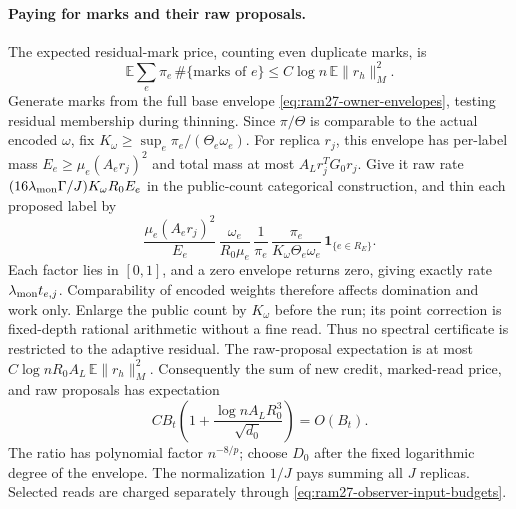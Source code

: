\documentclass[11pt]{article}
\theoremstyle{remark}
\newcommand{\Ex}{\mathbb E}
\newcommand{\norm}[1]{\lVert#1\rVert}
\begin{document}
\paragraph{Paying for marks and their raw proposals.}
The expected residual-mark price, counting even duplicate marks, is
\[
 \Ex\sum_e\pi_e\,\#\{\text{marks of }e\}
       \le C \log n\,\Ex\norm{r_h}_M^2 .
\]
Generate marks from the full base envelope \eqref{eq:ram27-owner-envelopes},
testing residual membership during thinning.
Since $\pi/\Theta$ is comparable to the actual encoded $\omega$, fix
$K_\omega\ge\sup_e\pi_e/(\Theta_e\omega_e)$.
For replica $r_j$, this envelope has per-label mass $E_e\ge\mu_e(A_er_j)^2$ and
total mass at most $A_L r_j^TG_0r_j$.
Give it raw rate $(16\lambda_{\rm mon}\Gamma/J)K_\omega R_0E_e$ in the
public-count categorical construction, and thin each proposed label by
\[
 \frac{\mu_e(A_er_j)^2}{E_e}\,
 \frac{\omega_e}{R_0\mu_e}\,
 \frac1{\pi_e}\,
 \frac{\pi_e}{K_\omega\Theta_e\omega_e}\,
                 \mathbf1_{\{e\in R_E\}}.
\]
Each factor lies in $[0,1]$, and a zero envelope returns zero, giving exactly
rate $\lambda_{\rm mon}t_{e,j}$.
Comparability of encoded weights therefore affects domination and work only.
Enlarge the public count by $K_\omega$ before the run; its point correction is
fixed-depth rational arithmetic without a fine read.
Thus no spectral certificate is restricted to the adaptive residual.
The raw-proposal expectation is at most $C \log n R_0 A_L\,\Ex\norm{r_h}_M^2$.
Consequently the sum of new credit, marked-read price, and raw proposals has
expectation
\begin{equation}\label{eq:ram27-observer-work}
 C B_t\left(1+\frac{\log n A_LR_0^3}{\sqrt{d_0}}\right)=O(B_t).
\end{equation}
The ratio has polynomial factor $n^{-8/p}$; choose $D_0$ after the fixed
logarithmic degree of the envelope.
The normalization $1/J$ pays summing all $J$ replicas.
Selected reads are charged separately through
\eqref{eq:ram27-observer-input-budgets}.
\end{document}
